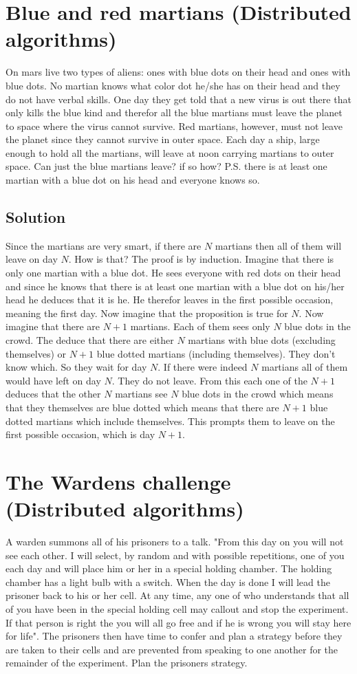 \documentclass{article}
\begin{document}
\section{Blue and red martians (Distributed algorithms)}
On mars live two types of aliens: ones with blue dots on their head and ones with blue dots. No martian knows what color dot he/she has on their head and they do not have verbal skills. One day they get told that a new virus is out there that only kills the blue kind and therefor all the blue martians must leave the planet to space where the virus cannot survive. Red martians, however, must not leave the planet since they cannot survive in outer space. Each day a ship, large enough to hold all the martians, will leave at noon carrying martians to outer space. Can just the blue martians leave? if so how? P.S. there is at least one martian with a blue dot on his head and everyone knows so.

\subsection{Solution}
Since the martians are very smart, if there are $N$ martians then all of them will leave on day $N$. How is that? The proof is by induction. Imagine that there is only one martian with a blue dot. He sees everyone with red dots on their head and since he knows that there is at least one martian with a blue dot on his/her head he deduces that it is he. He therefor leaves in the first possible occasion, meaning the first day. Now imagine that the proposition is true for $N$. Now imagine that there are $N+1$ martians. Each of them sees only $N$ blue dots in the crowd. The deduce that there are either $N$ martians with blue dots (excluding themselves) or $N+1$ blue dotted martians (including themselves). They don't know which. So they wait for day $N$. If there were indeed $N$ martians all of them would have left on day $N$. They do not leave. From this each one of the $N+1$ deduces that the other $N$ martians see $N$ blue dots in the crowd which means that they themselves are blue dotted which means that there are $N+1$ blue dotted martians which include themselves. This prompts them to leave on the first possible occasion, which is day $N+1$.

\section{The Wardens challenge (Distributed algorithms)}
A warden summons all of his prisoners to a talk. "From this day on you will not see each other. I will select, by random and with possible repetitions, one of you each day and will place him or her in a special holding chamber. The holding chamber has a light bulb with a switch. When the day is done I will lead the prisoner back to his or her cell. At any time, any one of who understands that all of you have been in the special holding cell may callout and stop the experiment. If that person is right the you will all go free and if he is wrong you will stay here for life". The prisoners then have time to confer and plan a strategy before they are taken to their cells and are prevented from speaking to one another for the remainder of the experiment. Plan the prisoners strategy.
\end{document}
